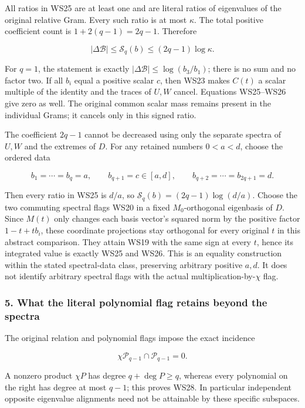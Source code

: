 All ratios in WS25 are at least one and are literal ratios of eigenvalues of the original relative Gram. Every such ratio is at most \(\kappa\). The total positive coefficient count is \(1+2(q-1)=2q-1\). Therefore

\[
\boxed{\quad |\Delta\mathcal B|
\le\mathscr S_q(b)\le(2q-1)\log\kappa.\quad}
\tag{WS26}
\]

For \(q=1\), the statement is exactly \(|\Delta\mathcal B|\le\log(b_3/b_1)\); there is no sum and no factor two. If all \(b_i\) equal a positive scalar \(c\), then WS23 makes \(C(t)\) a scalar multiple of the identity and the traces of \(U,W\) cancel. Equations WS25--WS26 give zero as well. The original common scalar mass remains present in the individual Grams; it cancels only in this signed ratio.

The coefficient \(2q-1\) cannot be decreased using only the separate spectra of \(U,W\) and the extremes of \(D\). For any retained numbers \(0<a<d\), choose the ordered data

\[
b_1=\cdots=b_q=a,
\qquad b_{q+1}=c\in[a,d],
\qquad b_{q+2}=\cdots=b_{2q+1}=d.
\tag{WS27}
\]

Then every ratio in WS25 is \(d/a\), so \(\mathscr S_q(b)=(2q-1)\log(d/a)\). Choose the two commuting spectral flags WS20 in a fixed \(M_0\)-orthogonal eigenbasis of \(D\). Since \(M(t)\) only changes each basis vector's squared norm by the positive factor \(1-t+tb_i\), these coordinate projections stay orthogonal for every original \(t\) in this abstract comparison. They attain WS19 with the same sign at every \(t\), hence its integrated value is exactly WS25 and WS26. This is an equality construction within the stated spectral-data class, preserving arbitrary positive \(a,d\). It does not identify arbitrary spectral flags with the actual multiplication-by-\(\chi\) flag.

\subsubsection{5. What the literal polynomial flag retains beyond the spectra}\label{endpoint-window_review--what-the-literal-polynomial-flag-retains-beyond-the-spectra}

The original relation and polynomial flags impose the exact incidence

\[
\chi\mathcal P_{q-1}\cap\mathcal P_{q-1}=0.
\tag{WS28}
\]

A nonzero product \(\chi P\) has degree \(q+\deg P\ge q\), whereas every polynomial on the right has degree at most \(q-1\); this proves WS28. In particular independent opposite eigenvalue alignments need not be attainable by these specific subspaces.

